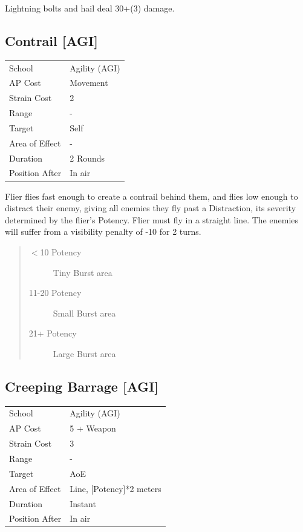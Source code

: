 \documentclass[11pt,a4paper,twocolumn]{book}
\begin{document}
\noindent
Lightning bolts and hail deal 30+(3) damage.

\vfill


\subsection*{Contrail [AGI]}
{
	\begin{tabu} to 75mm{| X[l,4] | X[l,7] |}
		\hline
		School 			& Agility (AGI) 	\\
        AP Cost	      	& Movement 			\\
        Strain Cost     & 2 				\\
        Range     		& - 				\\
        Target      	& Self 				\\
        Area of Effect  & - 	 			\\
        Duration     	& 2 Rounds 	 		\\
		Position After  & In air 			\\ \hline
	\end{tabu}
		
}

\medskip

Flier flies fast enough to create a contrail behind them, and flies low enough to distract their enemy, giving all enemies they fly past a Distraction, its severity determined by the flier's Potency. Flier must fly in a straight line. The enemies will suffer from a visibility penalty of -10 for 2 turns.

\begin{quote}
  \begin{description}
    \item[$<$10 Potency] 	Tiny Burst area
    \item[11-20 Potency] 	Small Burst area
    \item[21+ Potency] 	Large Burst area
  \end{description}
\end{quote}


\subsection*{Creeping Barrage [AGI]}
{
	\begin{tabu} to 75mm{| X[l,4] | X[l,7] |}
		\hline
		School 			& Agility (AGI) 	\\
        AP Cost	      	& 5 + Weapon 		\\
        Strain Cost     & 3 				\\
        Range     		& - 				\\
        Target      	& AoE 				\\
        Area of Effect  & Line, [Potency]*2 meters 	 	\\
        Duration     	& Instant 	 		\\
		Position After  & In air 			\\ \hline
	\end{tabu}
		
}
\end{document}
